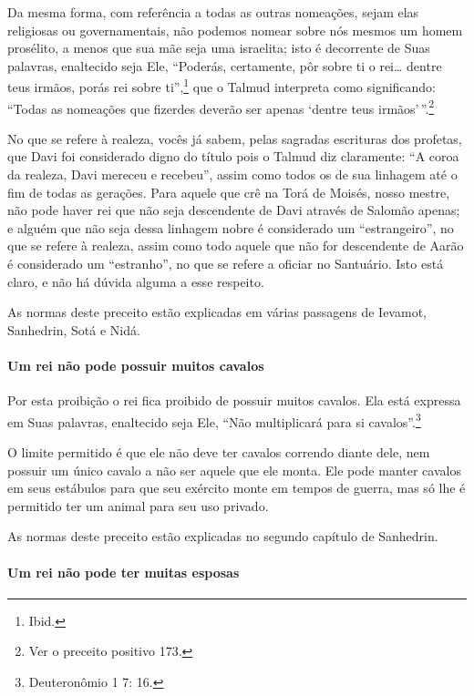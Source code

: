 \begin{multicols}{2}
Da mesma forma, com referência a todas as outras nomeações, sejam elas
religiosas ou governamentais, não podemos nomear sobre nós mesmos um
homem prosélito, a menos que sua mãe seja uma israelita; isto é
decorrente de Suas palavras, enaltecido seja Ele, ``Poderás,
certamente, pôr sobre ti o rei\ldots{} dentre teus irmãos, porás rei sobre
ti'',\footnote{Ibid.} que o Talmud\starr{} interpreta como significando: ``Todas as
nomeações que fizerdes deverão ser apenas `dentre teus
irmãos'\,''.\footnote{Ver o preceito positivo 173.}

No que se refere à realeza, vocês já sabem, pelas sagradas escrituras
dos profetas, que Davi foi considerado digno do título pois o Talmud\starr{} diz
claramente: ``A coroa da realeza, Davi mereceu e recebeu'', assim como
todos os de sua linhagem até o fim de todas as gerações. Para aquele que
crê na Torá\starr{} de Moisés, nosso mestre, não pode haver rei que não seja
descendente de Davi através de Salomão apenas; e alguém que não seja
dessa linhagem nobre é considerado um ``estrangeiro'', no que se refere
à realeza, assim como todo aquele que não for descendente de Aarão é
considerado um ``estranho'', no que se refere a oficiar no Santuário.
Isto está claro, e não há dúvida alguma a esse respeito.

As normas deste preceito estão explicadas em várias passagens de
Ievamot\starr, Sanhedrin\starr, Sotá\starr{} e Nidá\starr.

\paragraph{Um rei não pode possuir muitos cavalos}

Por esta proibição o rei fica proibido de possuir muitos cavalos. Ela
está expressa em Suas palavras, enaltecido seja Ele, ``Não multiplicará
para si cavalos''.\footnote{Deuteronômio 1 7: 16.}

O limite permitido é que ele não deve ter cavalos correndo diante dele,
nem possuir um único cavalo a não ser aquele que ele monta. Ele pode
manter cavalos em seus estábulos para que seu exército monte em tempos
de guerra, mas só lhe é permitido ter um animal para seu uso privado.

As normas deste preceito estão explicadas no segundo capítulo de Sanhedrin\starr.

\paragraph{Um rei não pode ter muitas esposas}


\end{multicols}
